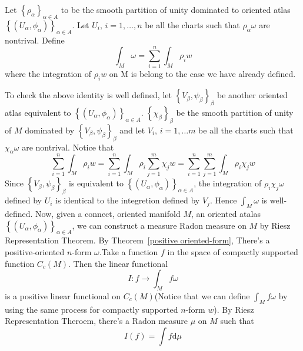 \documentclass[b5paper,12pt]{article}
\newcommand{\bbrace}[1]{\left\{ #1 \right\} }
\newcommand{\dd}{\text{d}}
\theoremstyle{definition}
\begin{document}
Let $\bbrace{\rho_{\alpha}}_{\alpha\in A}$ to be the smooth
partition of unity dominated to oriented atlas $\bbrace{(U_{\alpha},\phi_{\alpha})}_{\alpha\in A}$.
Let $U_i,\, i=1,\dots,n$ be all the charts such that $\rho_{\alpha}\omega$ are nontrival.
Define
\begin{equation*}
    \int_{M}\omega=\sum_{i=1}^n\int_M\rho_i w
\end{equation*}
where the integration of $\rho_i w$ on M is belong to the case we have already defined.

To check the above identity is well defined, let $\bbrace{V_{\beta},\psi_{\beta}}_{\beta}$ be another oriented atlas equivalent to $\bbrace{(U_{\alpha},\phi_{\alpha})}_{\alpha\in A}$.
$\bbrace{\chi_{\beta}}_{\beta}$ be the smooth partition of unity of $M$ dominated by $\bbrace{V_{\beta},\psi_{\beta}}_{\beta}$
and let $V_i,\, i=1,\dots m$ be all the charts such that $\chi_{\alpha}\omega$ are nontrival.
Notice that
\begin{equation*}
    \sum_{i=1}^n\int_M\rho_i w=\sum_{i=1}^n\int_M\rho_i\sum_{j=1}^m \chi_j w=\sum_{i=1}^n \sum_{j=1}^m \int_M \rho_i \chi_j w
\end{equation*}
Since $\bbrace{V_{\beta},\psi_{\beta}}_{\beta}$ is equivalent to $\bbrace{(U_{\alpha},\phi_{\alpha})}_{\alpha\in A}$,
the integration of $\rho_i \chi_j \omega$ defined by $U_i$ is identical to the integretion defined by $V_j$.
Hence $\int_M \omega $ is well-defined.
\vskip 1cm
Now, given a connect, oriented manifold $M$, an oriented atalas $\bbrace{(U_{\alpha},\phi_{\alpha})}_{\alpha\in A}$, we can construct a measure Radon measure on $M$ by Riesz Representation Theorem.
By Theorem~\ref*{positive oriented-form}, There's a positive-oriented $n$-form $\omega$.Take a function $f$ in the space of  compactly supported function $C_c(M)$. Then the linear functional
\begin{equation*}
    I:f\rightarrow \int_M f\omega
\end{equation*}
is a positive linear functional on $C_c(M)$(Notice that we can define $\int_M f\omega$ by using the same process for compactly supported $n$-form $w$). By Riesz Representation Theroem, there's a Radon measure $\mu$ on $M$ such that
\begin{equation*}
    I(f)=\int f \dd \mu
\end{equation*}
\end{document}
